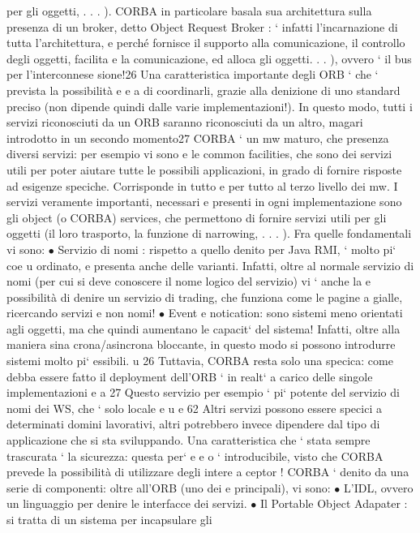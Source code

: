 \documentclass[a4paper,12pt]{article}
\begin{document}
per gli oggetti, . . . ).
CORBA in particolare basala sua architettura sulla presenza di un broker,
detto Object Request Broker : ` infatti l'incarnazione di tutta l'architettura,
e
perché fornisce il supporto alla comunicazione, il controllo degli oggetti, facilita
e
la comunicazione, ed alloca gli oggetti. . . ), ovvero ` il bus per l'interconnese
sione!26 Una caratteristica importante degli ORB ` che ` prevista la possibilità
e
e
a
di coordinarli, grazie alla denizione di uno standard preciso (non dipende quindi dalle varie implementazioni!). In
questo modo, tutti i servizi riconosciuti da
un ORB saranno riconosciuti da un altro, magari introdotto in un secondo
momento27
CORBA ` un mw maturo, che presenza diversi servizi: per esempio vi sono
e
le common facilities, che sono dei servizi utili per poter aiutare tutte le possibili
applicazioni, in grado di fornire risposte ad esigenze speciche. Corrisponde in
tutto e per tutto al terzo livello dei mw.
I servizi veramente importanti, necessari e presenti in ogni implementazione
sono gli object (o CORBA) services, che permettono di fornire servizi utili per gli
oggetti (il loro trasporto, la funzione di narrowing, . . . ). Fra quelle fondamentali
vi sono:
$\bullet$ Servizio di nomi : rispetto a quello denito per Java RMI, ` molto pi` coe
u
ordinato, e presenta anche delle varianti. Infatti, oltre al normale servizio
di nomi (per cui si deve conoscere il nome logico del servizio) vi ` anche la
e
possibilità di denire un servizio di trading, che funziona come le pagine
a
gialle, ricercando servizi e non nomi!
$\bullet$ Event e notication: sono sistemi meno orientati agli oggetti, ma che
quindi aumentano le capacit` del sistema! Infatti, oltre alla maniera sina
crona/asincrona bloccante, in questo modo si possono introdurre sistemi
molto pi` essibili.
u
26 Tuttavia, CORBA resta solo una specica: come debba essere fatto il deployment
dell'ORB ` in realt` a carico delle singole implementazioni
e
a
27 Questo servizio per esempio ` pi` potente del servizio di nomi dei WS, che ` solo locale
e u
e
62
Altri servizi possono essere specici a determinati domini lavorativi, altri potrebbero invece dipendere dal tipo di
applicazione che si sta sviluppando.
Una caratteristica che ` stata sempre trascurata ` la sicurezza: questa per`
e
e
o
` introducibile, visto che CORBA prevede la possibilità di utilizzare degli intere
a
ceptor !
CORBA ` denito da una serie di componenti: oltre all'ORB (uno dei
e
principali), vi sono:
$\bullet$ L'IDL, ovvero un linguaggio per denire le interfacce dei servizi.
$\bullet$ Il Portable Object Adapater : si tratta di un sistema per incapsulare gli
\end{document}
